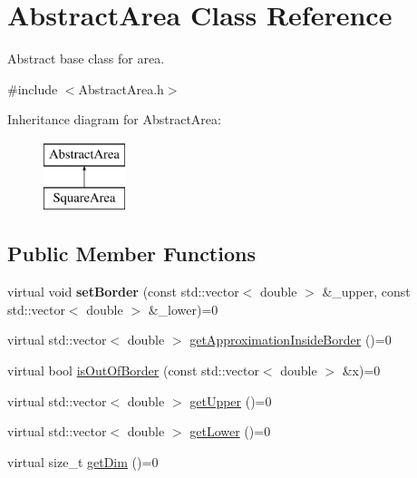 \hypertarget{class_abstract_area}{}\section{Abstract\+Area Class Reference}
\label{class_abstract_area}


Abstract base class for area.  




{\ttfamily \#include $<$Abstract\+Area.\+h$>$}

Inheritance diagram for Abstract\+Area\+:\begin{figure}[H]
\begin{center}
\leavevmode
\includegraphics[height=2.000000cm]{class_abstract_area}
\end{center}
\end{figure}
\subsection*{Public Member Functions}
\begin{DoxyCompactItemize}
\item 
\mbox{\label{class_abstract_area_a195e59e8c77d56c98dbac73febbd0adc}} 
virtual void {\bfseries set\+Border} (const std\+::vector$<$ double $>$ \&\+\_\+upper, const std\+::vector$<$ double $>$ \&\+\_\+lower)=0
\item 
virtual std\+::vector$<$ double $>$ \hyperlink{class_abstract_area_a832003b7c0e9e75d417c577b56a3013a}{get\+Approximation\+Inside\+Border} ()=0
\item 
virtual bool \hyperlink{class_abstract_area_a16c1ac9b2ece460e5e465cda862ce278}{is\+Out\+Of\+Border} (const std\+::vector$<$ double $>$ \&x)=0
\item 
virtual std\+::vector$<$ double $>$ \hyperlink{class_abstract_area_ab54f9d3063d994f780f2b5b67d8751d9}{get\+Upper} ()=0
\item 
virtual std\+::vector$<$ double $>$ \hyperlink{class_abstract_area_a6f5b9321813c982b37810b97c2a90257}{get\+Lower} ()=0
\item 
virtual size\+\_\+t \hyperlink{class_abstract_area_af7e07218e25ae2864d82d829ff1c10b9}{get\+Dim} ()=0
\end{DoxyCompactItemize}


